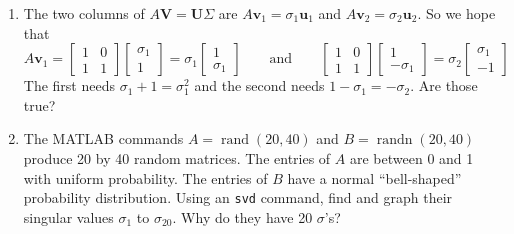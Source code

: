 \documentclass[14pt, a4paper]{article}
\begin{document}
\begin{enumerate}
    \item The two columns of $A\boldsymbol{V} = \boldsymbol{U}\Sigma$ are $A\boldsymbol{v}_1 = \sigma_1\boldsymbol{u}_1$ and $A\boldsymbol{v}_2 = \sigma_2\boldsymbol{u}_2$. So we hope that
          \[
              A\boldsymbol{v}_1 = \begin{bmatrix} 1 & 0 \\ 1 & 1 \end{bmatrix} \begin{bmatrix} \sigma_1 \\ 1 \end{bmatrix} = \sigma_1 \begin{bmatrix} 1 \\ \sigma_1 \end{bmatrix} \qquad \text{and} \qquad \begin{bmatrix} 1 & 0 \\ 1 & 1 \end{bmatrix} \begin{bmatrix} 1 \\ -\sigma_1 \end{bmatrix} = \sigma_2 \begin{bmatrix} \sigma_1 \\ -1 \end{bmatrix}
          \]
          The first needs $\sigma_1 + 1 = \sigma_1^2$ and the second needs $1 - \sigma_1 = -\sigma_2$. Are those true?

    \item The MATLAB commands $A = \operatorname{rand}(20, 40)$ and $B = \operatorname{randn}(20, 40)$ produce 20 by 40 random matrices. The entries of $A$ are between 0 and 1 with uniform probability. The entries of $B$ have a normal ``bell-shaped'' probability distribution. Using an \texttt{svd} command, find and graph their singular values $\sigma_1$ to $\sigma_{20}$. Why do they have 20 $\sigma$'s?
\end{enumerate}
\end{document}
